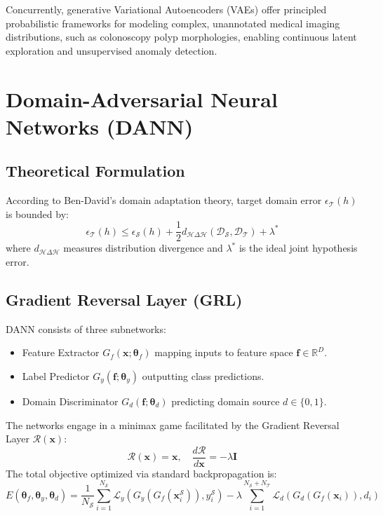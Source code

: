 \documentclass[conference]{IEEEtran}
\begin{document}
Concurrently, generative Variational Autoencoders (VAEs) offer principled probabilistic frameworks for modeling complex, unannotated medical imaging distributions, such as colonoscopy polyp morphologies, enabling continuous latent exploration and unsupervised anomaly detection.

\section{Domain-Adversarial Neural Networks (DANN)}

\subsection{Theoretical Formulation}
According to Ben-David's domain adaptation theory, target domain error $\epsilon_{\mathcal{T}}(h)$ is bounded by:
\begin{equation}
\epsilon_{\mathcal{T}}(h) \le \epsilon_{\mathcal{S}}(h) + \frac{1}{2} d_{\mathcal{H}\Delta\mathcal{H}}(\mathcal{D}_{\mathcal{S}}, \mathcal{D}_{\mathcal{T}}) + \lambda^*
\end{equation}
where $d_{\mathcal{H}\Delta\mathcal{H}}$ measures distribution divergence and $\lambda^*$ is the ideal joint hypothesis error.

\subsection{Gradient Reversal Layer (GRL)}
DANN consists of three subnetworks:
\begin{itemize}
    \item Feature Extractor $G_f(\mathbf{x}; \boldsymbol{\theta}_f)$ mapping inputs to feature space $\mathbf{f} \in \mathbb{R}^D$.
    \item Label Predictor $G_y(\mathbf{f}; \boldsymbol{\theta}_y)$ outputting class predictions.
    \item Domain Discriminator $G_d(\mathbf{f}; \boldsymbol{\theta}_d)$ predicting domain source $d \in \{0, 1\}$.
\end{itemize}
The networks engage in a minimax game facilitated by the Gradient Reversal Layer $\mathcal{R}(\mathbf{x})$:
\begin{equation}
\mathcal{R}(\mathbf{x}) = \mathbf{x}, \quad \frac{d \mathcal{R}}{d \mathbf{x}} = -\lambda \mathbf{I}
\end{equation}
The total objective optimized via standard backpropagation is:
\begin{equation}
E(\boldsymbol{\theta}_f, \boldsymbol{\theta}_y, \boldsymbol{\theta}_d) = \frac{1}{N_{\mathcal{S}}} \sum_{i=1}^{N_{\mathcal{S}}} \mathcal{L}_y(G_y(G_f(\mathbf{x}_i^{\mathcal{S}})), y_i^{\mathcal{S}}) - \lambda \sum_{i=1}^{N_{\mathcal{S}} + N_{\mathcal{T}}} \mathcal{L}_d(G_d(G_f(\mathbf{x}_i)), d_i)
\end{equation}
\end{document}
